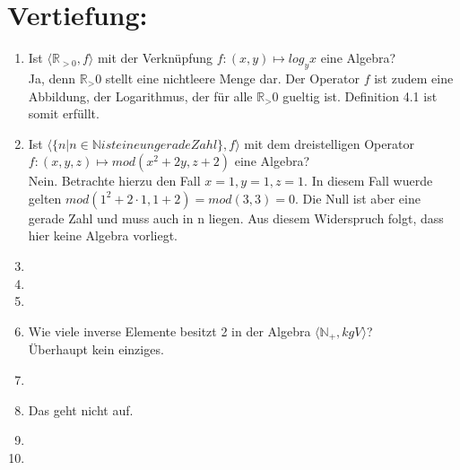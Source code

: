 



    \maketitle
    \section*{Vertiefung:}
    \begin{enumerate}[label=(\alph*)]
        \item Ist $\langle \mathbb{R}_{>0} , f \rangle$ mit der Verknüpfung $f : (x,y) \mapsto log_yx$ eine Algebra? \\
        Ja, denn $\mathbb{R}_>0 $ stellt eine nichtleere Menge dar. Der Operator $f$ ist zudem eine Abbildung, der Logarithmus, der  für alle $\mathbb{R}_>0$ gueltig ist. Definition 4.1 ist somit erfüllt.
        
        \item 
        Ist $\langle \{n| n \in \mathbb{N} ist eine ungerade Zahl \}, f \rangle$ mit dem dreistelligen Operator $f : (x,y,z) \mapsto mod(x^2 + 2y, z + 2)$ eine Algebra? \\
        Nein. Betrachte hierzu den Fall $ x = 1, y = 1, z = 1$. In diesem Fall wuerde gelten $mod(1^2 + 2 \cdot 1, 1 + 2 ) = mod(3,3) = 0$. Die Null ist aber eine gerade Zahl und muss auch in n liegen. Aus diesem Widerspruch folgt, dass hier keine Algebra vorliegt.
        
        \item
        
        \item 
        
        \item 
        
        \item Wie viele inverse Elemente besitzt 2 
        in der Algebra $\langle \mathbb{N}_+ , kgV \rangle$?\\
        Überhaupt kein einziges.
        
        \item 
        
        \item 
        Das geht nicht auf.
        
        \item
        
        \item         
        
        
    \end{enumerate}
